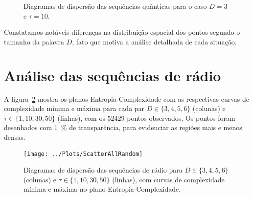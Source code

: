 \begin{figure}
\centering
{}
\caption{Diagramas de dispersão das sequências quânticas para o caso $D=3$ e $\tau=10$.}\label{Fig:QuantD3tau10}
\end{figure}


Constatamos notáveis diferenças na distribuição espacial dos pontos segundo o tamanho da palavra $D$, fato que motiva a análise detalhada de cada situação.

\section{Análise das sequências de rádio}

A figura~\ref{Fig:ScatterAllRandom} mostra os planos Entropia-Complexidade com as respectivas curvas de complexidade mínima e máxima para cada par $D\in\{3,4,5,6\}$ (colunas) e $\tau\in\{1,10,30,50\}$ (linhas), com os \num{52429} pontos observados.
Os pontos foram desenhados com \SI{1}{\percent} de transparência, para evidenciar as regiões mais e menos densas.

\begin{figure}[hbt]
	\centering
	\texttt{[image: ../Plots/ScatterAllRandom]}
	\caption{Diagramas de dispersão das sequências de rádio para $D\in\{3,4,5,6\}$ (colunas) e $\tau\in\{1,10,30,50\}$ (linhas), com curvas de complexidade mínima e máxima no plano Entropia-Complexidade.}\label{Fig:ScatterAllRandom}
\end{figure}

